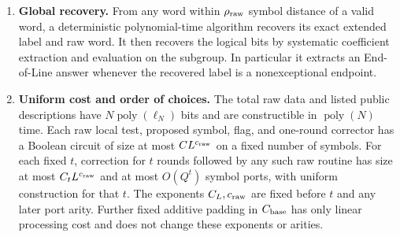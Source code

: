 \begin{theorem}
\begin{enumerate}[label=\textup{(\roman*)}]
determined only by $U$, with $|U^+|\leq|U|/2$. Consequently $t$ rounds
leave a prescribed uncertainty support of density at most
$2^{-t}|U|/|\Gamma|$. The guarantee holds for arbitrary values on $U$.
Different requested-center simulations may use different values there,
provided repeated occurrences of a position are consistent within each
individual cone.
\item \textbf{Global recovery.} From any word within
$\rho_{\rm raw}$ symbol distance of a valid word, a deterministic
polynomial-time algorithm recovers its exact extended label and raw
word. It then recovers the logical bits by systematic coefficient
extraction and evaluation on the subgroup. In particular it extracts an
End-of-Line answer whenever the recovered label is a nonexceptional
endpoint.
\item \textbf{Uniform cost and order of choices.} The total raw data and
listed public descriptions have $N\operatorname{poly}(\ell_N)$ bits
and are constructible in $\operatorname{poly}(N)$ time. Each raw local
test, proposed symbol, flag, and one-round corrector has a Boolean
circuit of size at most $CL^{c_{\rm raw}}$ on a fixed number of symbols.
For each fixed $t$, correction for $t$ rounds followed by any such raw
routine has size at most $C_tL^{c_{\rm raw}}$ and at most $O(Q^t)$
symbol ports, with uniform construction for that $t$. The exponents
$C_L,c_{\rm raw}$ are fixed before $t$ and any later port arity. Further
fixed additive padding in $C_{\rm base}$ has only linear processing
cost and does not change these exponents or arities.
\end{enumerate}
\end{theorem}

